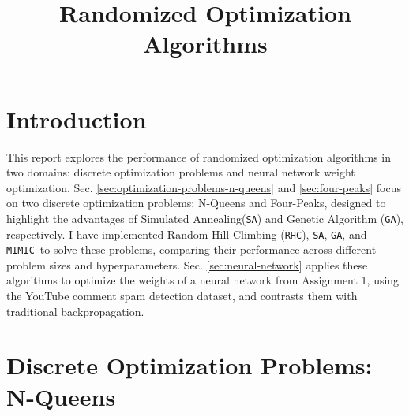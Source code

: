 \documentclass[conference]{IEEEtran}
\newcommand{\sa}{\texttt{SA}}
\newcommand{\ga}{\texttt{GA}}
\newcommand{\rhc}{\texttt{RHC}}
\newcommand{\mimic}{\texttt{MIMIC}}
\begin{document}
\setlength{\itemsep}{0pt} %
\setlength{\parskip}{0pt}
\title{Randomized Optimization Algorithms}
\author{}
\maketitle

\section{Introduction}
This report explores the performance of randomized optimization algorithms in two domains: discrete optimization problems and neural network weight optimization. Sec. \ref{sec:optimization-problems-n-queens} and \ref{sec:four-peaks} focus on two discrete optimization problems: N-Queens and Four-Peaks, designed to highlight the advantages of Simulated Annealing(\sa) and Genetic Algorithm (\ga), respectively. I have implemented Random Hill Climbing (\rhc), \sa, \ga, and \mimic\ to solve these problems, comparing their performance across different problem sizes and hyperparameters. Sec. \ref{sec:neural-network} applies these algorithms to optimize the weights of a neural network from Assignment 1, using the YouTube comment spam detection dataset, and contrasts them with traditional backpropagation.

\section{Discrete Optimization Problems: N-Queens\label{sec:optimization-problems-n-queens}}
\end{document}
